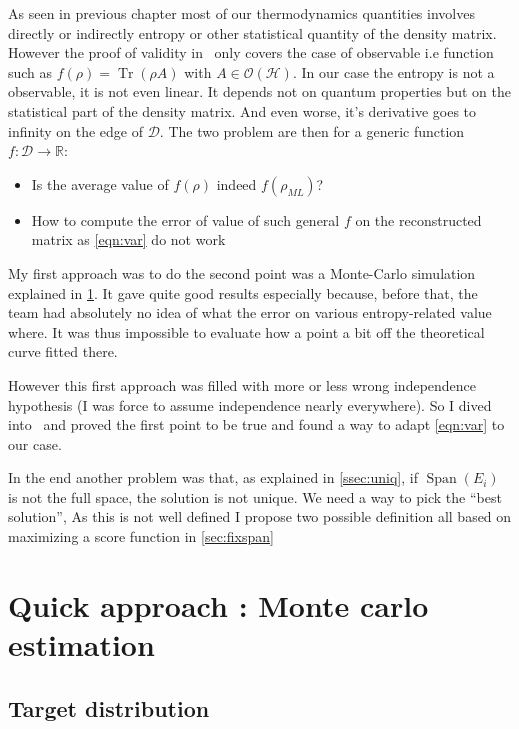 \documentclass[10pt]{report}
\theoremstyle{plain}
\theoremstyle{definition}
\theoremstyle{remark}
\newcommand{\R}{\ensuremath{\mathbb{R}}}
\DeclareMathOperator{\Tr}{Tr}
\DeclareMathOperator{\Span}{Span}
\newcommand{\ml}{_{M\!L}}
\begin{document}
As seen in previous chapter most of our thermodynamics quantities involves
directly or indirectly entropy or other statistical quantity of the density
matrix. However the proof of validity in~\cite{SPRAL17} only covers the case of
observable i.e function such as $f(\rho) = \Tr(\rho A)$ with $A \in
\mathcal{O}(\mathcal{H})$. In our case the entropy is not a observable, it is not even
linear. It depends not on quantum properties but on the statistical part of the
density matrix. And even worse, it's derivative goes to infinity on the edge of
$\mathcal{D}$. The two problem are then for a generic function $f : \mathcal{D}
\to \R$:
\begin{itemize}
\item Is the average value of $f(\rho)$ indeed $f(\rho\ml)$?
\item How to compute the error of value of such general $f$ on the reconstructed
  matrix as \cref{eqn:var} do not work
\end{itemize}

My first approach was to do the second point was a Monte-Carlo simulation
explained in \cref{sec:MC}. It gave quite good results especially because,
before that, the team had absolutely no idea of what the error on various
entropy-related value where. It was thus impossible to evaluate how a point a
bit off the theoretical curve fitted there.

However this first approach was filled with more or less wrong independence
hypothesis (I was force to assume independence nearly everywhere). So I dived
into~\cite{SPRAL17} and proved the first point to be true and found a way to
adapt \cref{eqn:var} to our case.

In the end another problem was that, as explained in \cref{ssec:uniq}, if
$\Span(E_i)$ is not the full space, the solution is not unique. We need a way to
pick the ``best solution'', As this is not well defined I propose two possible
definition all based on maximizing a score function in \cref{sec:fixspan}

\section{Quick approach : Monte carlo estimation}\label{sec:MC}

\subsection{Target distribution}

\end{document}
